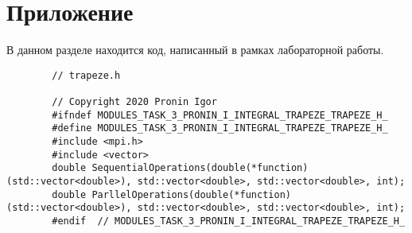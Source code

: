 \documentclass{report}
\begin{document}
	\section*{Приложение}
	В данном разделе находится код, написанный в рамках лабораторной работы.
	\begin{lstlisting}
		// trapeze.h
		
		// Copyright 2020 Pronin Igor
		#ifndef MODULES_TASK_3_PRONIN_I_INTEGRAL_TRAPEZE_TRAPEZE_H_
		#define MODULES_TASK_3_PRONIN_I_INTEGRAL_TRAPEZE_TRAPEZE_H_
		#include <mpi.h>
		#include <vector>
		double SequentialOperations(double(*function)(std::vector<double>), std::vector<double>, std::vector<double>, int);
		double ParllelOperations(double(*function)(std::vector<double>), std::vector<double>, std::vector<double>, int);
		#endif  // MODULES_TASK_3_PRONIN_I_INTEGRAL_TRAPEZE_TRAPEZE_H_
	\end{lstlisting}
\end{document}
